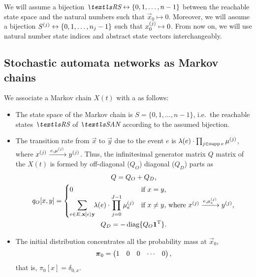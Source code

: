 We will assume a bijection
$\RS \leftrightarrow \{0, 1, \ldots, n - 1 \}$ between the reachable
state space and the natural numbers such that $\vec{x}_0 \mapsto 0$.
Moreover, we will assume a bijection
$\loc{S}{j} \leftrightarrow \{0, 1, \ldots, n_j - 1\}$ such that
$\loc{x_0}{j} \mapsto 0$. From now on, we will use natural number
state indices and abstract state vectors interchangeably.

\subsection{Stochastic automata networks as Markov chains}

We associate a Markov chain $X(t)$ with a  as follows:
\begin{itemize}
\item The state space of the Markov chain is $S = \{0, 1, \ldots, n -
  1\}$, i.e.~the reachable states $\RS$ of $\SAN$ according to the
  assumed bijection.
\item The transition rate from $\vec{x}$ to $\vec{y}$ due to the event
  $e$ is $\lambda(e) \cdot \prod_{j \in \supp e} \loc{\mu}{j}$, where
  $\loc{x}{j} \xrightarrow{e, \loc{\mu}{j}} \loc{y}{j}$. Thus, the
  infinitesimal generator matrix $Q$ matrix of the $X(t)$ is formed
  by off-diagonal ($Q_O$) diagonal ($Q_D$) parts as
  \begin{gather}
    Q = Q_O + Q_D \text, \\
    q_O[x, y] = \begin{cases}
      0 & \text{if $x = y$,} \\
      \displaystyle \sum_{e \in E, \vec{x} \tranto{e} \vec{y}} \!\!
      \lambda(e) \cdot \prod_{j = 0\vphantom{[}}^{J - 1} \loc{\mu_e}{j} &
      \text{if $x \ne y$, where $\loc{x}{j}
        \xrightarrow{e, \loc{\mu_e}{j}} \loc{y}{j}$,}
    \end{cases} \\
    Q_D = - \diag \{ Q_O \vec{1}^\T \} \text. \\
  \end{gather}
\item The initial distribution concentrates all the probability mass
  at $\vec{x}_0$,
  \begin{equation}
    \vec{\pi}_0 = \begin{pmatrix}
      1 & 0 & 0 & \cdots & 0
    \end{pmatrix}\text,
  \end{equation}
  that is, $\pi_0[x] = \delta_{0,x}$.
\end{itemize}

